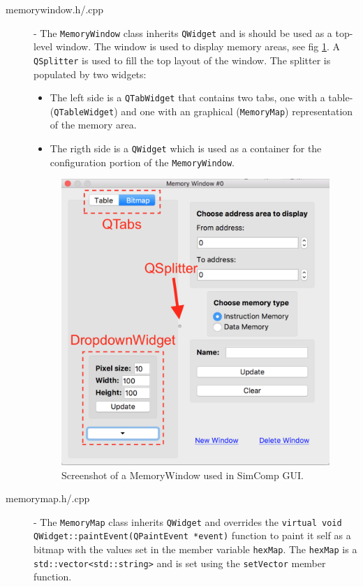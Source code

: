 \begin{description}
\item [memorywindow.h/.cpp] - The \texttt{MemoryWindow} class inherits \texttt{QWidget} and is should be used as a top-level window. The window is used to display memory areas, see fig \ref{fig:memorywindow}. A \texttt{QSplitter} is used to fill the top layout of the window. The splitter is populated by two widgets: 

\begin{itemize}
    \item The left side is a \texttt{QTabWidget} that contains two tabs, one with a table- (\texttt{QTableWidget}) and one with an graphical (\texttt{MemoryMap}) representation of the memory area.
    \item The rigth side is a \texttt{QWidget} which is used as a container for the configuration portion of the \texttt{MemoryWindow}.
\end{itemize}

\begin{figure}[H]
\centering
\includegraphics[scale=0.35]{img/MemoryWindow.png}
\caption{Screenshot of a MemoryWindow used in SimComp GUI.}
\label{fig:memorywindow}
\end{figure}

\item [memorymap.h/.cpp] - The \texttt{MemoryMap} class inherits \texttt{QWidget} and overrides the \texttt{virtual void QWidget::paintEvent(QPaintEvent *event)} function to paint it self as a bitmap with the values set in the member variable \texttt{hexMap}. The \texttt{hexMap} is a \texttt{std::vector<std::string>} and is set using the \texttt{setVector} member function.


\end{description}
